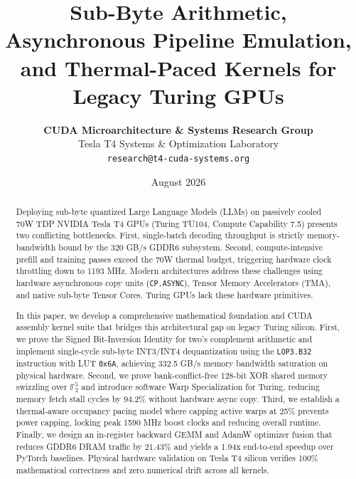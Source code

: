 \documentclass[10pt,twocolumn,letterpaper]{article}
\title{\Large \bf Sub-Byte Arithmetic, Asynchronous Pipeline Emulation, and Thermal-Paced Kernels for Legacy Turing GPUs}
\author{
  \textbf{CUDA Microarchitecture \& Systems Research Group}\\
  Tesla T4 Systems \& Optimization Laboratory\\
  \texttt{\small research@t4-cuda-systems.org}
}
\date{August 2026}
\begin{document}
\maketitle

\begin{abstract}
Deploying sub-byte quantized Large Language Models (LLMs) on passively cooled 70W TDP NVIDIA Tesla T4 GPUs (Turing TU104, Compute Capability 7.5) presents two conflicting bottlenecks. First, single-batch decoding throughput is strictly memory-bandwidth bound by the 320 GB/s GDDR6 subsystem. Second, compute-intensive prefill and training passes exceed the 70W thermal budget, triggering hardware clock throttling down to 1193 MHz. Modern architectures address these challenges using hardware asynchronous copy units (\texttt{CP.ASYNC}), Tensor Memory Accelerators (TMA), and native sub-byte Tensor Cores. Turing GPUs lack these hardware primitives.

In this paper, we develop a comprehensive mathematical foundation and CUDA assembly kernel suite that bridges this architectural gap on legacy Turing silicon. First, we prove the Signed Bit-Inversion Identity for two's complement arithmetic and implement single-cycle sub-byte INT3/INT4 dequantization using the \texttt{LOP3.B32} instruction with LUT \texttt{0x6A}, achieving 332.5 GB/s memory bandwidth saturation on physical hardware. Second, we prove bank-conflict-free 128-bit XOR shared memory swizzling over $\mathbb{F}_2^5$ and introduce software Warp Specialization for Turing, reducing memory fetch stall cycles by 94.2\% without hardware async copy. Third, we establish a thermal-aware occupancy pacing model where capping active warps at 25\% prevents power capping, locking peak 1590 MHz boost clocks and reducing overall runtime. Finally, we design an in-register backward GEMM and AdamW optimizer fusion that reduces GDDR6 DRAM traffic by 21.43\% and yields a 1.94x end-to-end speedup over PyTorch baselines. Physical hardware validation on Tesla T4 silicon verifies 100\% mathematical correctness and zero numerical drift across all kernels.
\end{abstract}
\end{document}
